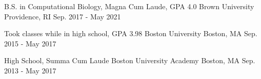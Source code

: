 
\begin{cventries}

  \vspace{-1mm}
  \cventry
    {B.S. in Computational Biology, Magna Cum Laude, GPA 4.0} %
    {Brown University} %
    {Providence, RI} %
    {Sep. 2017 - May 2021} %
    {}
  
  \vspace{-4mm}  
  \cventry
    {Took classes while in high school, GPA 3.98} %
    {Boston University} %
    {Boston, MA} %
    {Sep. 2015 - May 2017} %
    {}
   
  \vspace{-4mm}    
  \cventry
    {High School, Summa Cum Laude} %
    {Boston University Academy} %
    {Boston, MA} %
    {Sep. 2013 - May 2017} %
    {}
    
\end{cventries}
